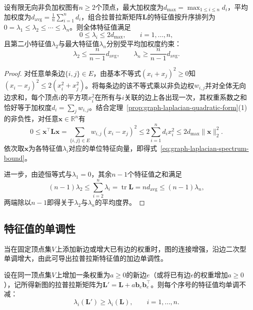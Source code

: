 \begin{theorem}[拉普拉斯特征值的度数界]
\label{prop:graph-laplacian-eigenvalue-bounds}
设有限无向非负加权图有$n\geq 2$个顶点，最大加权度为$d_{\max}=\max_{1\leq i\leq n}d_i$，平均加权度为$d_{\mathrm{avg}}=\frac1n\sum_{i=1}^n d_i$，组合拉普拉斯矩阵$\bm L$的特征值按升序排列为$0=\lambda_1\leq\lambda_2\leq\cdots\leq\lambda_n$。则全体特征值满足
\begin{equation}
  0\leq\lambda_i\leq 2d_{\max},\qquad i=1,\ldots,n,
  \label{eq:graph-laplacian-spectrum-bound}
\end{equation}
且第二小特征值$\lambda_2$与最大特征值$\lambda_n$分别受平均加权度约束：
\[
  \lambda_2\leq\frac{n}{n-1}d_{\mathrm{avg}},\qquad
  \lambda_n\geq\frac{n}{n-1}d_{\mathrm{avg}}.
\]
\end{theorem}

\begin{proof}
对任意单条边$\{i,j\}\in E$，由基本不等式$(x_i+x_j)^2\geq 0$知$(x_i-x_j)^2\leq 2(x_i^2+x_j^2)$。将每条边的该不等式乘以非负边权$w_{i,j}$并对全体无向边求和，每个顶点$i$的平方项$x_i^2$在所有与$i$关联的边上各出现一次，其权重系数之和恰好等于加权度$d_i=\sum_j w_{i,j}$。结合定理~\ref{prop:graph-laplacian-quadratic-form}(1)的非负性，对任意$\bm x\in\mathbb R^n$有
\[
  0\leq \bm x^\top\bm L\bm x
  =\sum_{\{i,j\}\in E}w_{i,j}(x_i-x_j)^2
  \leq 2\sum_{i=1}^n d_ix_i^2
  \leq 2d_{\max}\lVert\bm x\rVert_2^2.
\]
依次取$\bm x$为各特征值$\lambda_i$对应的单位特征向量，即得式~\eqref{eq:graph-laplacian-spectrum-bound}。

进一步，由迹恒等式与$\lambda_1=0$，其余$n-1$个特征值之和满足
\[
  (n-1)\lambda_2\leq\sum_{i=2}^n\lambda_i=\operatorname{tr}\bm L=n d_{\mathrm{avg}}\leq (n-1)\lambda_n,
\]
两端除以$n-1$即得关于$\lambda_2$与$\lambda_n$的平均度界。
\end{proof}

\subsection{特征值的单调性}
\label{sec:graph-laplacian-monotonicity}

当在固定顶点集$V$上添加新边或增大已有边的权重时，图的连接增强，沿边二次型单调增大，由此可导出拉普拉斯特征值的加边单调性。

\begin{theorem}[拉普拉斯特征值的加边单调性]
\label{thm:graph-laplacian-monotonicity}
设在同一顶点集$V$上增加一条权重为$a\geq 0$的新边$e$（或将已有边$e$的权重增加$a\geq 0$），记所得新图的拉普拉斯矩阵为$\bm L'=\bm L+a\bm b_e\bm b_e^\top$。则每个序号的特征值均单调不减：
\begin{equation}
  \lambda_i(\bm L')\geq\lambda_i(\bm L),\qquad i=1,\ldots,n.
  \label{eq:graph-laplacian-edge-monotonicity}
\end{equation}
\end{theorem}

